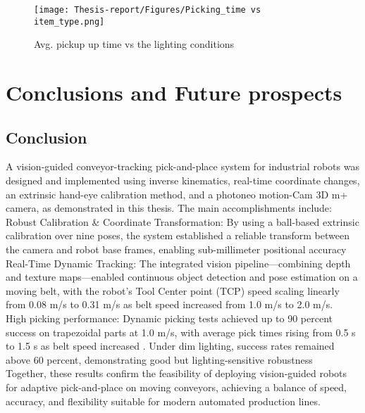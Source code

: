 \documentclass[12pt]{article}
\begin{document}
\begin{figure}[h]
    \centering
    \texttt{[image: Thesis-report/Figures/Picking\_time vs item\_type.png]}
    \caption{Avg. pickup up time vs the lighting conditions \cite{ref22}}
    \label{fig1.Photoneo Cmaera}
\end{figure}

\newpage
\section{Conclusions and Future prospects}
\label{Conclusion}

\subsection{Conclusion}
    
A vision-guided conveyor-tracking pick-and-place system for industrial robots was designed and implemented using inverse kinematics, real-time coordinate changes, an extrinsic hand-eye calibration method, and a photoneo motion-Cam 3D m+ camera, as demonstrated in this thesis.  The main accomplishments include:\\

Robust Calibration \& Coordinate Transformation: By using a ball-based extrinsic calibration over nine poses, the system established a reliable transform between the camera and robot base frames, enabling sub-millimeter positional accuracy\\


Real-Time Dynamic Tracking: The integrated vision pipeline—combining depth and texture maps—enabled continuous object detection and pose estimation on a moving belt, with the robot’s Tool Center point (TCP) speed scaling linearly from 0.08 m/s to 0.31 m/s as belt speed increased from 1.0 m/s to 2.0 m/s.\\


High picking performance: Dynamic picking tests achieved up to 90 percent success on trapezoidal parts at 1.0 m/s, with average pick times rising from 0.5 s to 1.5 s as belt speed increased 
. Under dim lighting, success rates remained above 60 percent, demonstrating good but lighting-sensitive robustness\\

Together, these results confirm the feasibility of deploying vision‑guided robots for adaptive pick‑and‑place on moving conveyors, achieving a balance of speed, accuracy, and flexibility suitable for modern automated production lines.
\newpage
\end{document}
